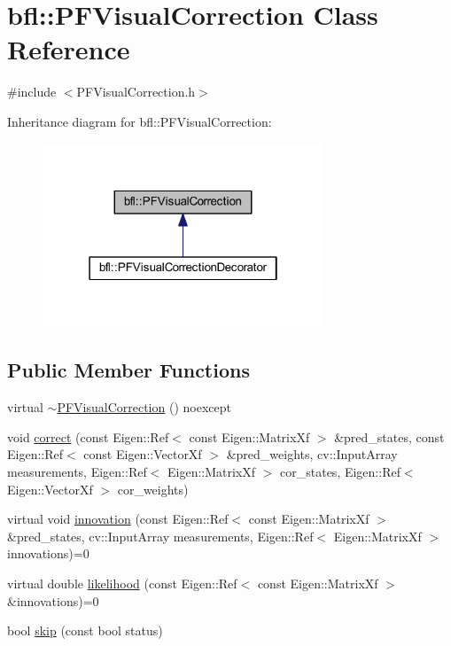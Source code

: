 \hypertarget{classbfl_1_1PFVisualCorrection}{}\section{bfl\+:\+:P\+F\+Visual\+Correction Class Reference}
\label{classbfl_1_1PFVisualCorrection}


{\ttfamily \#include $<$P\+F\+Visual\+Correction.\+h$>$}



Inheritance diagram for bfl\+:\+:P\+F\+Visual\+Correction\+:
\nopagebreak
\begin{figure}[H]
\begin{center}
\leavevmode
\includegraphics[width=238pt]{classbfl_1_1PFVisualCorrection__inherit__graph}
\end{center}
\end{figure}
\subsection*{Public Member Functions}
\begin{DoxyCompactItemize}
\item 
virtual \mbox{\hyperlink{classbfl_1_1PFVisualCorrection_aa22ef40790e5d6b65d2cec4691c1d12b}{$\sim$\+P\+F\+Visual\+Correction}} () noexcept
\item 
void \mbox{\hyperlink{classbfl_1_1PFVisualCorrection_a85b68264ccaf46d5e68f8ea9c93d82cd}{correct}} (const Eigen\+::\+Ref$<$ const Eigen\+::\+Matrix\+Xf $>$ \&pred\+\_\+states, const Eigen\+::\+Ref$<$ const Eigen\+::\+Vector\+Xf $>$ \&pred\+\_\+weights, cv\+::\+Input\+Array measurements, Eigen\+::\+Ref$<$ Eigen\+::\+Matrix\+Xf $>$ cor\+\_\+states, Eigen\+::\+Ref$<$ Eigen\+::\+Vector\+Xf $>$ cor\+\_\+weights)
\item 
virtual void \mbox{\hyperlink{classbfl_1_1PFVisualCorrection_acbc20b602ce5277407bf6afe8d7b4b29}{innovation}} (const Eigen\+::\+Ref$<$ const Eigen\+::\+Matrix\+Xf $>$ \&pred\+\_\+states, cv\+::\+Input\+Array measurements, Eigen\+::\+Ref$<$ Eigen\+::\+Matrix\+Xf $>$ innovations)=0
\item 
virtual double \mbox{\hyperlink{classbfl_1_1PFVisualCorrection_a57527f43323af18321bd9654a4bb00d5}{likelihood}} (const Eigen\+::\+Ref$<$ const Eigen\+::\+Matrix\+Xf $>$ \&innovations)=0
\item 
bool \mbox{\hyperlink{classbfl_1_1PFVisualCorrection_afbe70e2ab0be5459c79fe4eabd27cf9f}{skip}} (const bool status)
\end{DoxyCompactItemize}
